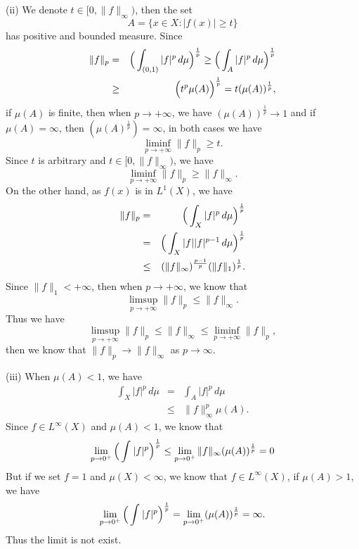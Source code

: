 \documentclass[12pt]{article}
\begin{document}
(ii) We denote $t \in [0, \|f \|_{\infty})$, then the set 
\begin{equation*}
   A = \{x \in X: |f(x)| \geq t \}
\end{equation*}
has positive and bounded measure. Since
\begin{eqnarray*}
\|f\|_{p} & = & \Big{(} \int_{(0, 1)}^{} |f|^{p} \, d \mu \Big{)}^{\frac{1}{p}} \geq \Big{(} \int_{A}^{} |f|^{p} \, d \mu \Big{)}^{\frac{1}{p}} \\
& \geq & \Big{(} t^{p} \mu(A)\Big{)}^{\frac{1}{p}} = t (\mu(A))^{\frac{1}{p}},
\end{eqnarray*}
if $\mu(A)$ is finite, then when $p \to + \infty$, we have $(\mu(A))^{\frac{1}{p}} \to 1$ and if $\mu(A) = \infty$, then $(\mu(A)^{\frac{1}{p}}) = \infty$, in both cases we have
\begin{equation*}
   \liminf_{p \to + \infty} \|f\|_{p} \geq t.
\end{equation*}
Since $t$ is arbitrary and $t \in [0, \|f \|_{\infty})$, we have
\begin{equation*}
   \liminf_{p \to + \infty} \|f\|_{p} \geq \|f \|_{\infty} .
\end{equation*}
On the other hand, as $f(x)$ is in $L^{1}(X)$, we have
\begin{eqnarray*}
    \|f\|_{p} &=& \Big{(} \int_{X}^{} |f|^{p} \, d \mu \Big{)}^{\frac{1}{p}} \\
    &=& \Big{(} \int_{X}^{} |f| |f|^{p-1} \, d \mu \Big{)}^{\frac{1}{p}} \\
    & \leq &  (\|f\|_{\infty})^{\frac{p-1}{p}} (\|f\|_{1})^{\frac{1}{p}} .
\end{eqnarray*}
Since $\|f\|_{1} < + \infty$, then when $p \to + \infty$, we know that
\begin{equation*}
   \limsup_{p \to + \infty} \|f\|_{p} \leq \|f \|_{\infty} .
\end{equation*}
Thus we have
\begin{equation*}
   \limsup_{p \to + \infty} \|f\|_{p} \leq \|f \|_{\infty} \leq \liminf_{p \to + \infty} \|f\|_{p},
\end{equation*}
then we know that $\|f \|_{p} \rightarrow \|f \|_{\infty}$ as $p \rightarrow \infty$.


(iii) When $\mu(A)<1$, we have
\begin{eqnarray*}
    \int_{X}^{} |f|^{p} \, d \mu &=& \int_{A}^{} |f|^{p} \, d \mu \\
    & \leq & \|f\|_{\infty}^{p} \mu(A).
\end{eqnarray*}
Since $f \in L^{\infty}(X)$ and $\mu(A) < 1$, we know that
\begin{equation*}
    \lim_{p \to 0^{+}} \Big{(} \int_{}^{} |f|^{p} \Big{)}^{\frac{1}{p}} \leq \lim_{p \to 0^{+}} \|f\|_{\infty} (\mu(A))^{\frac{1}{p}} = 0
\end{equation*}
But if we set $f = 1$ and $\mu(X) < \infty$, we know that $f \in L^{\infty}(X)$, if $\mu(A) > 1$, we have
\begin{equation*}
    \lim_{p \to 0^{+}} \Big{(} \int_{}^{} |f|^{p} \Big{)}^{\frac{1}{p}} = \lim_{p \to 0^{+}} (\mu(A))^{\frac{1}{p}} = \infty.
\end{equation*}
Thus the limit is not exist.
\end{document}
